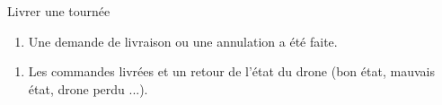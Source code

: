﻿\begin{UseCase}{Livrer une tournée}



\begin{UseCasePre}
    \begin{enumerate}
        \item Une demande de livraison ou une annulation a été faite.
    \end{enumerate}
\end{UseCasePre}

\begin{UseCasePost}
    \begin{enumerate}
        \item Les commandes livrées et un retour de l'état du drone (bon état,
            mauvais état, drone perdu ...).
    \end{enumerate}
\end{UseCasePost}


\end{UseCase}
